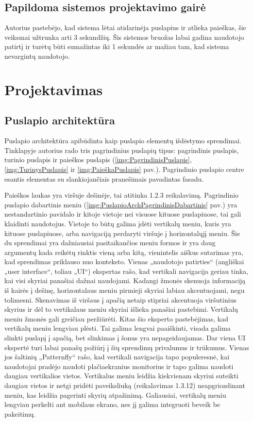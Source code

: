 \documentclass{VUMIFPSkursinis}
\begin{document}
\subsection{Papildoma sistemos projektavimo gairė}
Autorius pastebėjo, kad sistema lėtai atidarinėja puslapius ir atlieka paieškas, šie veiksmai užtrunka arti 3 sekundžių. Šis sistemos bruožas labai gadina naudotojo patirtį ir turėtų būti sumažintas iki 1 sekundės ar mažiau tam, kad sistema nevargintų naudotojo.


\section{Projektavimas}
\subsection{Puslapio architektūra}
Puslapio architektūra apibūdinta kaip puslapio elementų išdėstymo sprendimai. Tinklapyje autorius rado tris pagrindinius puslapių tipus: pagrindinis puslapis, turinio puslapis ir paieškos puslapis (\ref{img:PagrindinisPuslapis}, \ref{img:TurinysPuslapis} ir \ref{img:PaieškaPuslapis} pav.). Pagrindinio puslapio centre esantis elementas su slankiojančiais pranešimais pavadintas fasadu.

Paieškos laukas yra viršuje dešinėje, tai atitinka 1.2.3 reikalavimą. Pagrindinio puslapio dabartinis meniu (\ref{img:PuslapioArchPagrindinisDabartinis} pav.) yra nestandartinio pavidalo ir kitoje vietoje nei visuose kituose puslapiuose, tai gali klaidinti naudotojus. Vietoje to būtų galima įdėti vertikalų meniu, kuris yra kituose puslapiuose, arba navigaciją perdaryti viršuje į horizontalųjį meniu. Šie du sprendimai yra dažniausiai pasitaikančios meniu formos ir yra daug argumentų kada reikėtų rinktis vieną arba kitą, vienintelis aiškus sutarimas yra, kad sprendimas priklauso nuo konteksto. Vienas „naudotojo patirties“ (angliškai „user interface“, toliau „UI“) ekspertas rašo, kad vertikali navigacija geriau tinka, kai visi skyriai panašiai dažnai naudojami\cite{TopVsLeftNav}. Kadangi žmonės skenuoja informaciją iš kairės į dešinę, horizontalaus meniu pirmieji skyriai labiau akcentuojami, negu tolimesni. Skenavimas iš viršaus į apačią netaip stipriai akcentuoja viršutinius skyrius ir dėl to vertikalaus meniu skyriai išlieka panašiai pastebimi. Vertikalų meniu žmonės gali greičiau peržiūrėti\cite{TopVsLeftNav}. Kitas šio eksperto pastebėjimas, kad vertikalų meniu lengviau plėsti\cite{TopVsLeftNav}. Tai galima lengvai paaiškinti, visada galima slinkti puslapį į apačią, bet slinkimas į šonus yra nepageidaujamas. Dar viena UI ekspertė turi labai panašų požiūrį į šių sprendimų privalumus ir trūkumus\cite{TopVsLeftNav2}. Vienas jos šaltinių „Patternfly“ rašo, kad vertikali navigacija tapo populeresnė, kai naudotojai pradėjo naudoti plačiaekranius monitorius ir tapo galima naudoti daugiau vertikalios vietos\cite{LeftNav}. Vertikalus meniu leidžia kiekvienam skyriui suteikti daugiau vietos ir netgi pridėti paveiksliuką (reikalavimas 1.3.12) neapgriozdinant meniu, kas leidžia pagerinti skyrių atpažinimą. Galiausiai, vertikalų meniu lengviau perkelti ant mobilaus ekrano, nes jį galima integruoti beveik be pakeitimų.
\end{document}
